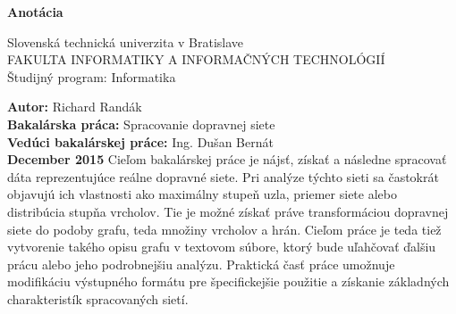 \documentclass[12pt,twoside,slovak,a4paper]{article}
\begin{document}
\begin{titlepage}
\setlength{\parindent}{0pt}
\Large
\textbf{Anotácia}
\normalsize
\newline
\newline
\begin{center}
Slovenská technická univerzita v Bratislave\\
FAKULTA INFORMATIKY A INFORMAČNÝCH TECHNOLÓGIÍ\\
Študijný program: Informatika\\
\end{center}

\textbf{Autor:} Richard Randák \\
\textbf{Bakalárska práca:} Spracovanie dopravnej siete \\
\textbf{Vedúci bakalárskej práce:} Ing. Dušan Bernát \\
\textbf{December 2015}
\newline
\newline
Cieľom bakalárskej práce je nájsť, získať a následne spracovať dáta reprezentujúce reálne dopravné siete. Pri analýze týchto sieti sa častokrát objavujú ich vlastnosti ako maximálny stupeň uzla, priemer siete alebo distribúcia stupňa vrcholov. Tie je možné získať práve transformáciou dopravnej siete do podoby grafu, teda množiny vrcholov a hrán.  Cieľom práce je teda tiež vytvorenie takého opisu grafu v textovom súbore, ktorý bude uľahčovať ďalšiu prácu alebo jeho podrobnejšiu analýzu. Praktická časť práce umožnuje modifikáciu výstupného formátu pre špecifickejšie použitie a získanie základných charakteristík spracovaných sietí.
\end{titlepage}
\end{document}

